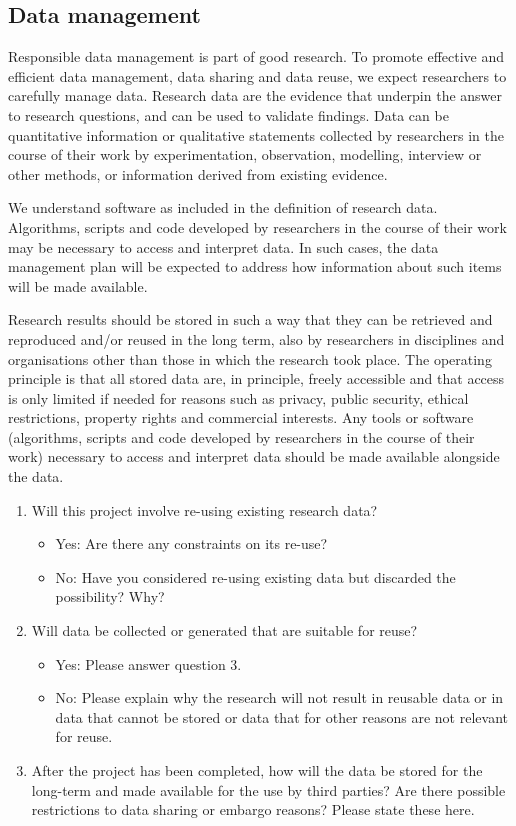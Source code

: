 \documentclass{article}
\begin{document}
\subsection{Data management}
Responsible data management is part of good research. To promote effective and efficient data management, data sharing and data reuse, we expect researchers to carefully manage data. Research data are the evidence that underpin the answer to research questions, and can be used to validate findings. Data can be quantitative information or qualitative statements collected by researchers in the course of their work by experimentation, observation, modelling, interview or other methods, or information derived from existing evidence. 

We understand software as included in the definition of research data. Algorithms, scripts and code developed by researchers in the course of their work may be necessary to access and interpret data. In such cases, the data management plan will be expected to address how information about such items will be made available.

Research results should be stored in such a way that they can be retrieved and reproduced and/or reused in the long term, also by researchers in disciplines and organisations other than those in which the research took place. The operating principle is that all stored data are, in principle, freely accessible and that access is only limited if needed for reasons such as privacy, public security, ethical restrictions, property rights and commercial interests. Any tools or software (algorithms, scripts and code developed by researchers in the course of their work) necessary to access and interpret data should be made available alongside the data.

\begin{enumerate}
\item Will this project involve re-using existing research data?
\begin{itemize}
\item Yes: Are there any constraints on its re-use?
\item No: Have you considered re-using existing data but discarded the possibility? Why?
\end{itemize}

\item Will data be collected or generated that are suitable for reuse? 
\begin{itemize}
\item Yes: Please answer question 3.
\item No: Please explain why the research will not result in reusable data or in data that cannot be stored or data that for other reasons are not relevant for reuse. 
\end{itemize}
 
\item After the project has been completed, how will the data be stored for the long-term and made available for the use by third parties? Are there possible restrictions to data sharing or embargo reasons? Please state these here.
\end{enumerate}
\end{document}
